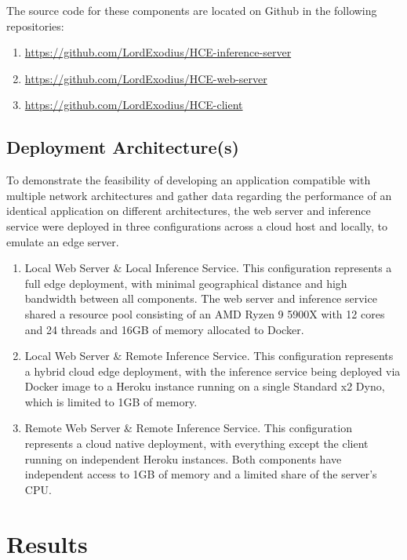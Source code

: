 \documentclass[11pt]{article}
\begin{document}
\noindent The source code for these components are located on Github in the following repositories:
\begin{enumerate}
    \item \url{https://github.com/LordExodius/HCE-inference-server}
    \item \url{https://github.com/LordExodius/HCE-web-server}
    \item \url{https://github.com/LordExodius/HCE-client}
\end{enumerate}

\subsection{Deployment Architecture(s)}
To demonstrate the feasibility of developing an application compatible with multiple network 
architectures and gather data regarding the performance of an identical application on different
architectures, the web server and inference service were deployed in three configurations across 
a cloud host and locally, to emulate an edge server.

\begin{enumerate}
    \item {
        Local Web Server \& Local Inference Service. This configuration represents a full edge 
        deployment, with minimal geographical distance and high bandwidth between all components.
        The web server and inference service shared a resource pool consisting of an AMD Ryzen 9 5900X
        with 12 cores and 24 threads and 16GB of memory allocated to Docker.
    }
    \item {
        Local Web Server \& Remote Inference Service. This configuration represents a hybrid
        cloud edge deployment, with the inference service being deployed via Docker image to a
        Heroku instance running on a single Standard x2 Dyno, which is limited to 1GB of memory.
    }
    \item {
        Remote Web Server \& Remote Inference Service. This configuration represents a cloud native
        deployment, with everything except the client running on independent Heroku instances.
        Both components have independent access to 1GB of memory and a limited share of the server's CPU.
    }
\end{enumerate}



\newpage
\section{Results}
\end{document}
